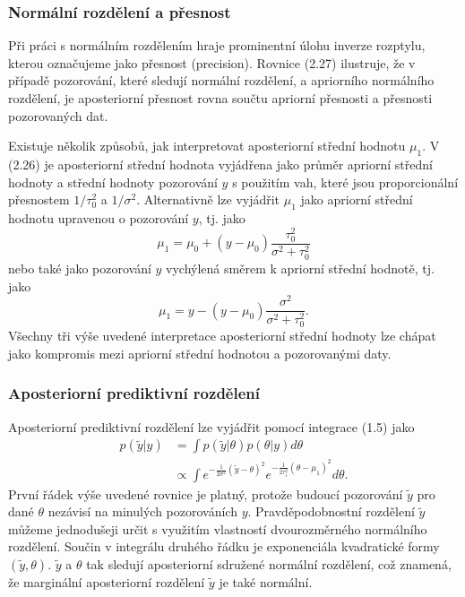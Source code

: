 \subsubsection{Normální rozdělení a přesnost}

Při práci s normálním rozdělením hraje prominentní úlohu inverze rozptylu, kterou označujeme jako přesnost (precision). Rovnice (2.27) ilustruje, že v případě pozorování, které sledují normální rozdělení, a apriorního normálního rozdělení, je aposteriorní přesnost rovna součtu apriorní přesnosti a přesnosti pozorovaných dat.

Existuje několik způsobů, jak interpretovat aposteriorní střední hodnotu $\mu_1$. V (2.26) je aposteriorní střední hodnota vyjádřena jako průměr apriorní střední hodnoty a střední hodnoty pozorování $y$ s použitím vah, které jsou proporcionální přesnostem $1/\tau_0^2$ a $1 / \sigma^2$. Alternativně lze vyjádřit $\mu_1$ jako apriorní střední hodnotu upravenou o pozorování $y$, tj. jako
\begin{equation}
\mu_1 = \mu_0 + (y - \mu_0) \frac{\tau_0^2}{\sigma^2 + \tau_0^2}
\end{equation}
nebo také jako pozorování $y$ vychýlená směrem k apriorní střední hodnotě, tj. jako
\begin{equation}
\mu_1 = y - (y - \mu_0) \frac{\sigma^2}{\sigma^2 + \tau_0^2}.
\end{equation}
Všechny tři výše uvedené interpretace aposteriorní střední hodnoty lze chápat jako kompromis mezi apriorní střední hodnotou a pozorovanými daty.

\subsubsection{Aposteriorní prediktivní rozdělení}

Aposteriorní prediktivní rozdělení lze vyjádřit pomocí integrace (1.5) jako
\begin{equation}
\begin{split}
p(\tilde{y}|y) & = \int p(\tilde{y}|\theta) p(\theta | y) d \theta\\
 & \propto \int e^{-\frac{1}{2 \sigma^2}(\tilde{y} - \theta)^2}e^{-\frac{1}{2 \tau_1^2}(\theta - \mu_1)^2}d\theta.
\end{split}
\end{equation}
První řádek výše uvedené rovnice je platný, protože budoucí pozorování $\tilde{y}$ pro dané $\theta$ nezávisí na minulých pozorováních $y$. Pravděpodobnostní rozdělení $\tilde{y}$ můžeme jednodušeji určit s využitím vlastností dvourozměrného normálního rozdělení. Součin v integrálu druhého řádku je exponenciála kvadratické formy $(\tilde{y}, \theta)$. $\tilde{y}$ a $\theta$ tak sledují aposteriorní sdružené normální rozdělení, což znamená, že marginální aposteriorní rozdělení $\tilde{y}$ je také normální.

